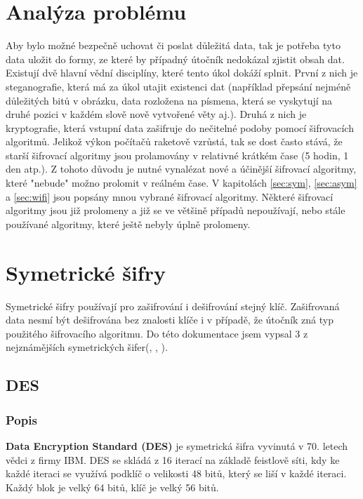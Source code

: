 \documentclass[12pt, a4paper]{article}
\begin{document}
\section{Analýza problému}
Aby bylo možné bezpečně uchovat či poslat důležitá data, tak je potřeba tyto data uložit do formy, ze které by případný útočník nedokázal zjistit obsah dat. Existují dvě hlavní vědní disciplíny, které tento úkol dokáží splnit. První z nich je steganografie, která má za úkol utajit existenci dat (například přepsání nejméně důležitých bitů v obrázku, data rozložena na písmena, která se vyskytují na druhé pozici v každém slově nově vytvořené věty aj.). Druhá z nich je kryptografie, která vstupní data zašifruje do nečitelné podoby pomocí šifrovacích algoritmů. Jelikož výkon počítačů raketově vzrůstá, tak se dost často stává, že starší šifrovací algoritmy jsou prolamovány v relativné krátkém čase (5 hodin, 1 den atp.). Z tohoto důvodu je nutné vynalézat nové a účinější šifrovací algoritmy, které "nebude" možno prolomit v reálném čase. V kapitolách \ref{sec:sym}, \ref{sec:asym} a \ref{sec:wifi} jsou popsány mnou vybrané šifrovací algoritmy. Některé šifrovací algoritmy jsou již prolomeny a již se ve většině případů nepoužívají, nebo stále používané algoritmy, které ještě nebyly úplně prolomeny.

\section{Symetrické šifry}
Symetrické šifry používají pro zašifrování i dešifrování stejný klíč. Zašifrovaná data nesmí být dešifrována bez znalosti klíče i v případě, že útočník zná typ použitého šifrovacího algoritmu. Do této dokumentace jsem vypsal 3 z nejznámějších symetrických šifer(, , ).  
\label{sec:sym}
	\subsection{DES}
	\label{subsec:des}
		\subsubsection{Popis}
		\textbf{Data Encryption Standard (DES)} je symetrická šifra vyvinutá v 70. letech vědci z firmy IBM. DES se skládá z 16 iterací na základě feistlově síti, kdy ke každé iteraci se využívá podklíč o velikosti 48 bitů, který se liší v každé iteraci. Každý blok je velký 64 bitů, klíč je velký 56 bitů.
\end{document}
